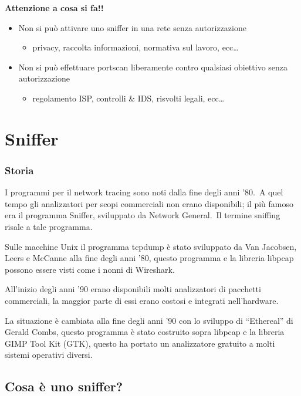 \begin{center}
    \textbf{Attenzione a cosa si fa!!}
\end{center}
\begin{itemize}
    \item Non si può attivare uno sniffer in una rete senza autorizzazione
          \begin{itemize}
              \item privacy, raccolta informazioni, normativa sul lavoro, ecc\dots
          \end{itemize}
    \item Non si può effettuare portscan liberamente contro qualsiasi obiettivo senza autorizzazione
          \begin{itemize}
              \item regolamento ISP, controlli \& IDS, risvolti legali, ecc\dots
          \end{itemize}
\end{itemize}

\section{Sniffer}

\subsubsection{Storia}

I programmi per il network tracing sono noti dalla fine degli anni '80.\
A quel tempo gli analizzatori per scopi commerciali non erano disponibili; il più famoso era il programma Sniffer, sviluppato da Network General.\
Il termine sniffing risale a tale programma.\


Sulle macchine Unix il programma tcpdump è stato sviluppato da Van Jacobsen, Leers e McCanne alla fine degli anni '80, questo programma e la libreria libpcap possono essere visti come i nonni di Wireshark.

All'inizio degli anni '90 erano disponibili molti analizzatori di pacchetti commerciali, la maggior parte di essi erano costosi e integrati nell'hardware.\


La situazione è cambiata alla fine degli anni '90 con lo sviluppo di ``Ethereal'' di Gerald Combs, questo programma è stato costruito sopra libpcap e la libreria GIMP Tool Kit (GTK), questo ha portato un analizzatore gratuito a molti sistemi operativi diversi.

\subsection{Cosa è uno sniffer?}

